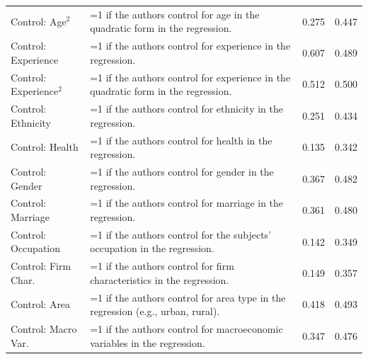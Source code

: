 \begin{singlespace}
\begin{scriptsize}
\begin{longtable}{
@{\hskip\tabcolsep\extracolsep\fill}
l
p{0.55\hsize}
cc
@{}
}
       Control: Age$^2$ &                                                                                   =1 if the authors control for age in the quadratic form in the regression. &    0.275 &  0.447 \\
    Control: Experience &                                                                                              =1 if the authors control for experience in the regression. &    0.607 &  0.489 \\
Control: Experience$^2$ &                                                                            =1 if the authors control for experience in the quadratic form in the regression. &    0.512 &  0.500 \\
     Control: Ethnicity &                                                                                               =1 if the authors control for ethnicity in the regression. &    0.251 &  0.434 \\
        Control: Health &                                                                                                  =1 if the authors control for health in the regression. &    0.135 &  0.342 \\
        Control: Gender &                                                                                                  =1 if the authors control for gender in the regression. &    0.367 &  0.482 \\
      Control: Marriage &                                                                                                =1 if the authors control for marriage in the regression. &    0.361 &  0.480 \\
    Control: Occupation &                                                                              =1 if the authors control for the subjects' occupation in the regression. &    0.142 &  0.349 \\
    Control: Firm Char. &                                                                                    =1 if the authors control for firm characteristics in the regression. &    0.149 &  0.357 \\
          Control: Area &                                                                          =1 if the authors control for area type in the regression (e.g., urban, rural). &    0.418 &  0.493 \\
    Control: Macro Var. &                                                                                 =1 if the authors control for macroeconomic variables in the regression. &    0.347 &  0.476 \\
    \midrule
    

\end{longtable}
\end{scriptsize}
\end{singlespace}
